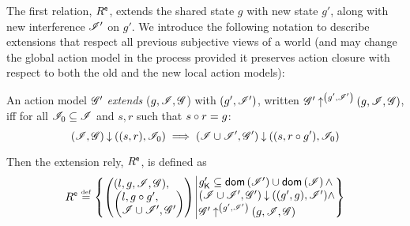 The first relation, $R^{\textsf{e}}$, extends the shared state $g$ with new
state $g'$, along with new interference $\mathscr{I}'$ on $g'$. We introduce
the following notation to describe extensions that respect all
previous subjective views of a world (and may change the global action
model in the process provided it preserves action closure with respect
to both the old and the new local action models):
\begin{definition}\label{def:amodExtension}
An action model $\mathscr{G}'$ \emph{extends} ($g, \mathscr{I}, \mathscr{G}$) with
$(g', \mathscr{I}')$, written
$\mathscr{G}' \mathbin{\uparrow}^{\left(g', \mathscr{I}'\right)} (g, \mathscr{I}, \mathscr{G})$, iff for all
$\mathscr{I}_0 \subseteq \mathscr{I}$ and $s, r$ such that $s \circ r = g$:
\[
(\mathscr{I}, \mathscr{G}) \mathbin{\downarrow} ((s, r), \mathscr{I}_0) \implies (\mathscr{I} \cup \mathscr{I}', \mathscr{G}') \mathbin{\downarrow} ((s, r\circ g'), \mathscr{I}_0)
\]
\end{definition}
Then the extension rely, $R^{\textsf{e}}$, is defined as
\[
  \extendR \eqdef
  \left\{
  \begin{array}{@{} l @{\hspace*{2pt}} | @{\hspace*{2pt}} r @{}}
    \left(
    \begin{array}{@{} l @{}}
      (l , g, \lmod, \gmod),\\
      \left(
      \begin{array}{@{} l @{}}
	l,
	g \composeL g',\\
	\lmod \cup \lmod', \gmod'
      \end{array}
      \right)
    \end{array}
    \right)
    &
    \begin{array}{@{} l @{}}
      \capPart{g'} \subseteq \dom{\lmod'} \cup \dom{\lmod} \land \\
      \extendsAM{\lmod \cup \lmod', \gmod'}{g'}{g}{\lmod'} \land \\
      \expandsAM{\gmod'}{g'}{\lmod'}{g}{\lmod}{\gmod}
    \end{array}
  \end{array}
  \right\}
\]


